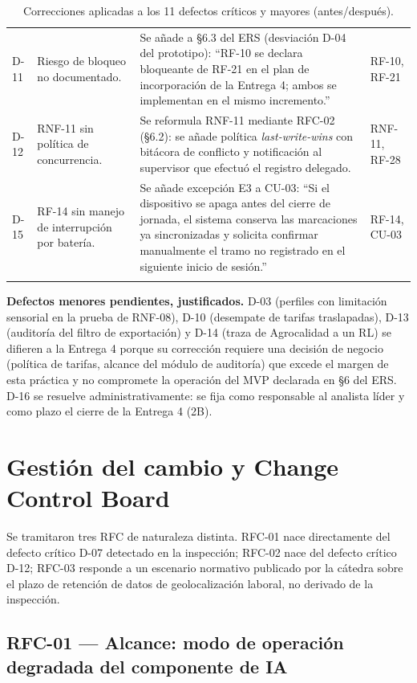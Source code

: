 \documentclass[11pt,a4paper]{article}
\begin{document}
\begin{longtable}{p{0.7cm}p{5.3cm}p{5.3cm}p{1.5cm}}
D-11 & Riesgo de bloqueo no documentado. & Se añade a \S6.3 del ERS (desviación D-04 del prototipo): ``RF-10 se declara bloqueante de RF-21 en el plan de incorporación de la Entrega 4; ambos se implementan en el mismo incremento.'' & RF-10, RF-21 \\
D-12 & RNF-11 sin política de concurrencia. & Se reformula RNF-11 mediante RFC-02 (\S6.2): se añade política \emph{last-write-wins} con bitácora de conflicto y notificación al supervisor que efectuó el registro delegado. & RNF-11, RF-28 \\
D-15 & RF-14 sin manejo de interrupción por batería. & Se añade excepción E3 a CU-03: ``Si el dispositivo se apaga antes del cierre de jornada, el sistema conserva las marcaciones ya sincronizadas y solicita confirmar manualmente el tramo no registrado en el siguiente inicio de sesión.'' & RF-14, CU-03 \\
\bottomrule
\caption{Correcciones aplicadas a los 11 defectos críticos y mayores (antes/después).}
\label{tab:correcciones}
\end{longtable}

\noindent\textbf{Defectos menores pendientes, justificados.} D-03 (perfiles con limitación
sensorial en la prueba de RNF-08), D-10 (desempate de tarifas traslapadas), D-13 (auditoría del
filtro de exportación) y D-14 (traza de Agrocalidad a un RL) se difieren a la Entrega 4 porque su
corrección requiere una decisión de negocio (política de tarifas, alcance del módulo de
auditoría) que excede el margen de esta práctica y no compromete la operación del MVP declarada
en \S6 del ERS. D-16 se resuelve administrativamente: se fija como responsable al analista líder
y como plazo el cierre de la Entrega 4 (2B).

\section{Gestión del cambio y Change Control Board}

Se tramitaron tres RFC de naturaleza distinta. RFC-01 nace directamente del defecto crítico D-07
detectado en la inspección; RFC-02 nace del defecto crítico D-12; RFC-03 responde a un escenario
normativo publicado por la cátedra sobre el plazo de retención de datos de geolocalización
laboral, no derivado de la inspección.

\subsection{RFC-01 --- Alcance: modo de operación degradada del componente de IA}
\end{document}
